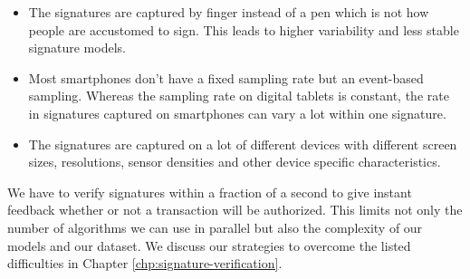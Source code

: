 \documentclass[a4paper, oneside]{csthesis}
\begin{document}
\begin{itemize}
    \item The signatures are captured by finger instead of a pen which is not how people are accustomed to sign. This leads to higher variability and less stable signature models.
    \item Most smartphones don't have a fixed sampling rate but an event-based sampling. Whereas the sampling rate on digital tablets is constant, the rate in signatures captured on smartphones can vary a lot within one signature.
    \item The signatures are captured on a lot of different devices with different screen sizes, resolutions, sensor densities and other device specific characteristics.
\end{itemize}

We have to verify signatures within a fraction of a second to give instant feedback whether or not a transaction will be authorized. This limits not only the number of algorithms we can use in parallel but also the complexity of our models and our dataset.
We discuss our strategies to overcome the listed difficulties in Chapter \ref{chp:signature-verification}.





\end{document}

